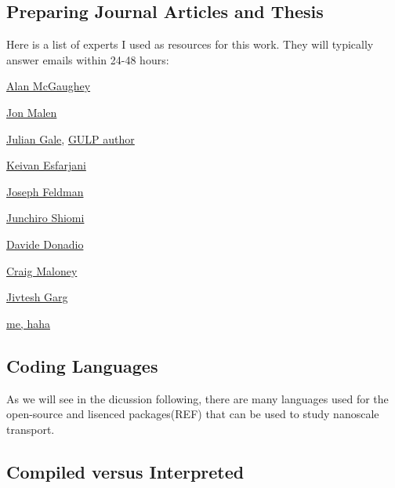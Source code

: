 \subsection{Preparing Journal Articles and Thesis}

Here is a list of experts I used as resources for this work. They 
will typically answer emails within 24-48 hours:

\href{http://ntpl.me.cmu.edu/people.html}
{Alan McGaughey}

\href{http://www.cmu.edu/me/malen/Lab_Website/People.html}
{Jon Malen}

\href{http://chemistry.curtin.edu.au/people/academic.cfm/J.Gale}
{Julian Gale}, 
\href{http://projects.ivec.org/gulp/news.html}
{GULP author}

\href{http://mech.rutgers.edu/content/keivan-esfarjani}
{Keivan Esfarjani}

\href{mailto:joseph.feldman.ctr@nrl.navy.mil}
{Joseph Feldman}

\href{http://www.phonon.t.u-tokyo.ac.jp/}
{Junchiro Shiomi}

\href{http://www2.mpip-mainz.mpg.de/~donadio/tnt/People.html}
{Davide Donadio}

\href{http://www.ce.cmu.edu/people/faculty/maloney.html}
{Craig Maloney}

\href{http://quasiamore.mit.edu/pmwiki.php?n=Main.JivteshGarg}
{Jivtesh Garg}

\href{http://jasonlarkin.github.io}{me, haha}

\subsection{Coding Languages}

As we will see in the dicussion following, there are many languages 
used for the open-source and lisenced packages(REF) that can be used 
to study nanoscale transport.
\subsection{Compiled versus Interpreted}

